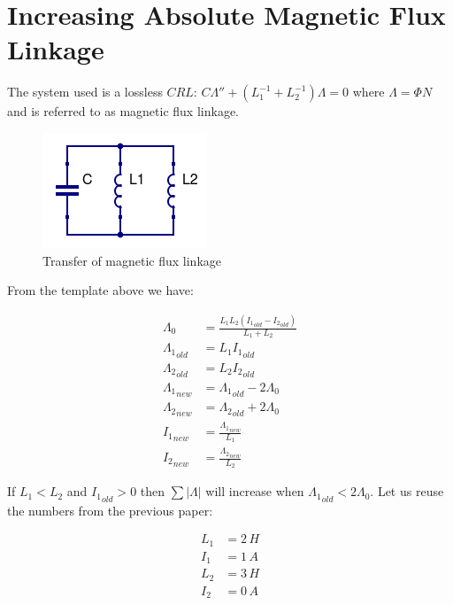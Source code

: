 \documentclass[]{elementary-physics}
\begin{document}
\section{Increasing Absolute Magnetic Flux Linkage}

The system used is a lossless $CRL$\cite{ef3ch}: $C \Lambda'' + (L_1^{-1} + L_2^{-1}) \Lambda = 0$ where $\Lambda = \Phi N$ and is referred to as magnetic flux linkage.

\begin{figure}[ht] \centering
	\includegraphics[scale=.5]{CLL} \caption{Transfer of magnetic flux linkage}
\end{figure}

From the template above we have:

\begin{subequations}
\begin{align}
\Lambda_0 &= \frac{L_1 L_2 ({I_1}_{old}-{I_2}_{old})}{L_1 + L_2} \\
{\Lambda_1}_{old} &= L_1 {I_1}_{old} \\
{\Lambda_2}_{old} &= L_2 {I_2}_{old} \\
{\Lambda_1}_{new} &= {\Lambda_1}_{old} -2 \Lambda_0 \\
{\Lambda_2}_{new} &= {\Lambda_2}_{old} +2 \Lambda_0 \\
{I_1}_{new} &= \frac{{\Lambda_1}_{new}}{L_1} \\
{I_2}_{new} &= \frac{{\Lambda_2}_{new}}{L_2}
\end{align}
\end{subequations}

If $L_1 < L_2$ and ${I_1}_{old} > 0$ then $\sum |\Lambda|$ will increase when ${\Lambda_1}_{old} < 2 \Lambda_0$.
Let us reuse the numbers from the previous paper\cite{ef2ch}:

\begin{subequations}
\begin{align}
L_1 &= 2 \, H \\
I_1 &= 1 \, A \\
L_2 &= 3 \, H \\
I_2 &= 0 \, A
\end{align}
\end{subequations}
\end{document}
